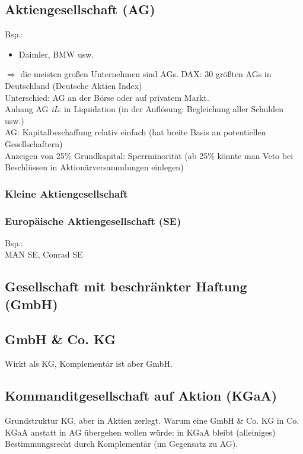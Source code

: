 \subsection{Aktiengesellschaft (AG)}
Bsp.:
\begin{itemize}
\item Daimler, BMW usw.
\end{itemize}
$\Rightarrow$ die meisten großen Unternehmen sind AGs.
DAX: 30 größten AGs in Deutschland (Deutsche Aktien Index)\\
Unterschied: AG an der Börse oder auf privatem Markt.\\
Anhang AG \emph{iL}: in Liquidation (in der Auflösung: Begleichung aller Schulden usw.)\\
AG: Kapitalbeschaffung relativ einfach (hat breite Basis an potentiellen Gesellschaftern)\\
Anzeigen von 25\% Grundkapital: Sperrminorität (ab 25\% könnte man Veto bei Beschlüssen in Aktionärversammlungen einlegen)
\subsubsection{Kleine Aktiengesellschaft}
\subsubsection{Europäische Aktiengesellschaft (SE)}
Bsp.:\\
MAN SE, Conrad SE

\subsection{Gesellschaft mit beschränkter Haftung (GmbH)}

\subsection{GmbH \& Co. KG}
Wirkt als KG, Komplementär ist aber GmbH.

\subsection{Kommanditgesellschaft auf Aktion (KGaA)}
Grundstruktur KG, aber in Aktien zerlegt.
Warum eine GmbH \& Co. KG in Co. KGaA anstatt in AG übergehen wollen würde: in KGaA bleibt (alleiniges) Bestimmungsrecht durch Komplementär (im Gegensatz zu AG).

